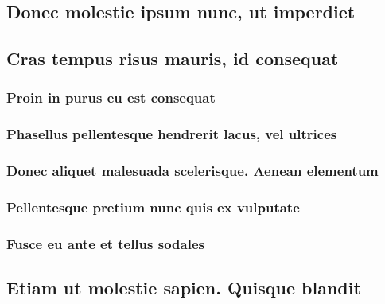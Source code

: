 \documentclass[bachelor, english, debug]{student}
\begin{document}
\lipsum[1-8]

\subsection{Donec molestie ipsum nunc, ut imperdiet}

\lipsum[1-8]

\subsection{Cras tempus risus mauris, id consequat}

\lipsum[1-8]

\subsubsection{Proin in purus eu est consequat}

\lipsum[1-8]

\subsubsection{Phasellus pellentesque hendrerit lacus, vel ultrices}

\lipsum[1-8]

\subsubsection{Donec aliquet malesuada scelerisque. Aenean elementum}

\lipsum[1-8]

\subsubsection{Pellentesque pretium nunc quis ex vulputate}

\lipsum[1-8]

\subsubsection{Fusce eu ante et tellus sodales}

\lipsum[1-8]

\subsection{Etiam ut molestie sapien. Quisque blandit}

\lipsum[1-8]
\end{document}
